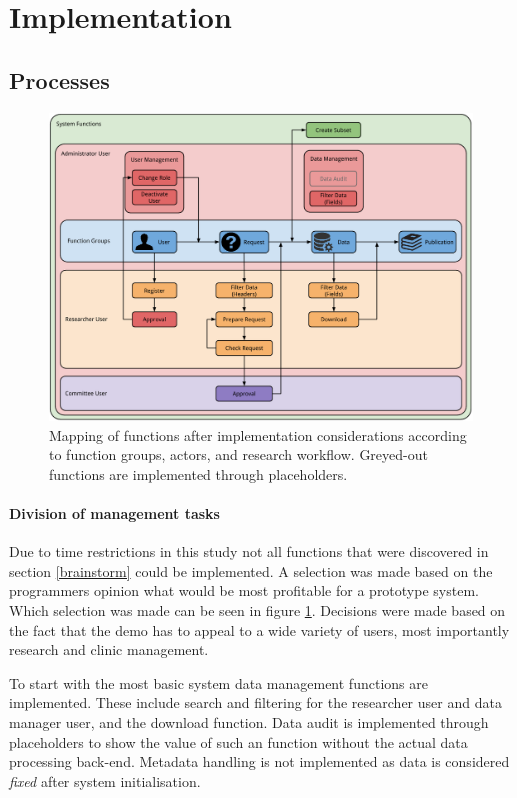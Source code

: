 \section{Implementation}

\subsection{Processes}

\begin{figure}[!b]
	\centering
	\includegraphics[width=1.0\linewidth]{images/functions-implemented}
	\caption{
		Mapping of functions after implementation considerations according to function groups, actors, and research workflow.
		Greyed-out functions are implemented through placeholders.
	}
	\label{fig:functions-implemented}
\end{figure}

\paragraph{Division of management tasks}
Due to time restrictions in this study not all functions that were discovered in section \ref{brainstorm} could be implemented.
A selection was made based on the programmers opinion what would be most profitable for a prototype system.
Which selection was made can be seen in figure \ref{fig:functions-implemented}.
Decisions were made based on the fact that the demo has to appeal to a wide variety of users, most importantly research and clinic management.

To start with the most basic system data management functions are implemented.
These include search and filtering for the researcher user and data manager user, and the download function.
Data audit is implemented through placeholders to show the value of such an function without the actual data processing back-end.
Metadata handling is not implemented as data is considered \emph{fixed} after system initialisation.

